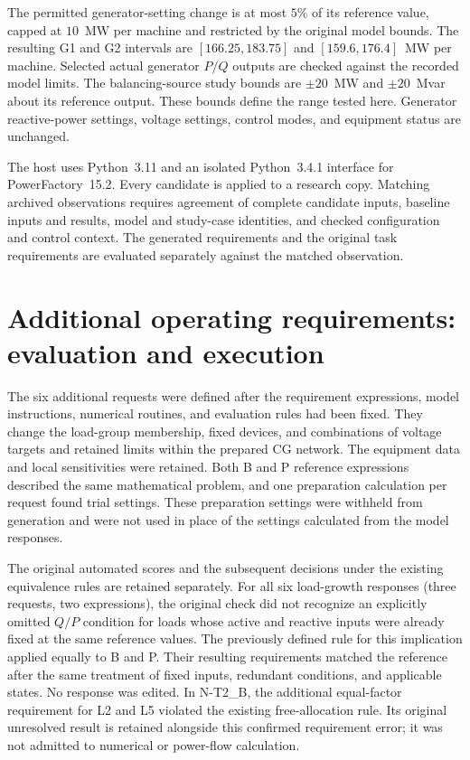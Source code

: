 The permitted generator-setting change is at most $5\%$ of its reference value, capped at $10$~MW per machine and restricted by the original model bounds. The resulting G1 and G2 intervals are $[166.25,183.75]$ and $[159.6,176.4]$~MW per machine. Selected actual generator $P/Q$ outputs are checked against the recorded model limits. The balancing-source study bounds are $\pm20$~MW and $\pm20$~Mvar about its reference output. These bounds define the range tested here. Generator reactive-power settings, voltage settings, control modes, and equipment status are unchanged.


The host uses Python~3.11 and an isolated Python~3.4.1 interface for PowerFactory~15.2. Every candidate is applied to a research copy. Matching archived observations requires agreement of complete candidate inputs, baseline inputs and results, model and study-case identities, and checked configuration and control context. The generated requirements and the original task requirements are evaluated separately against the matched observation.

\section{Additional operating requirements: evaluation and execution}
\label{app:new-requirements}

The six additional requests were defined after the requirement expressions, model instructions, numerical routines, and evaluation rules had been fixed. They change the load-group membership, fixed devices, and combinations of voltage targets and retained limits within the prepared CG network. The equipment data and local sensitivities were retained. Both B and P reference expressions described the same mathematical problem, and one preparation calculation per request found trial settings. These preparation settings were withheld from generation and were not used in place of the settings calculated from the model responses.

The original automated scores and the subsequent decisions under the existing equivalence rules are retained separately. For all six load-growth responses (three requests, two expressions), the original check did not recognize an explicitly omitted $Q/P$ condition for loads whose active and reactive inputs were already fixed at the same reference values. The previously defined rule for this implication applied equally to B and P. Their resulting requirements matched the reference after the same treatment of fixed inputs, redundant conditions, and applicable states. No response was edited. In N-T2\_B, the additional equal-factor requirement for L2 and L5 violated the existing free-allocation rule. Its original unresolved result is retained alongside this confirmed requirement error; it was not admitted to numerical or power-flow calculation.

